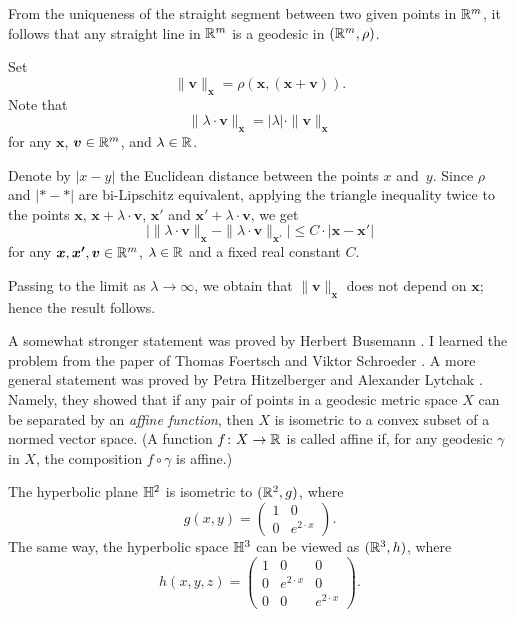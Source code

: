 From the uniqueness of the straight segment between two given points in $\mathbb{R}^m$,
it follows that any straight line in $\mathbb{R}^m$ is a geodesic in $(\mathbb{R}^m,\rho)$.

Set 
\[\|\bm{v}\|_{\bm{x}}=\rho(\bm{x},(\bm{x}+\bm{v})).\]
Note that 
\[ \|\lambda\cdot\bm{v}\|_{\bm{x}}
=
|\lambda|\cdot\|\bm{v}\|_{\bm{x}}\]
for any $\bm{x}$, $\bm{v}\in\mathbb{R}^m$, and $\lambda\in\mathbb{R}$.

Denote by $|x-y|$ the Euclidean distance between the points $x$ and~$y$.
Since $\rho$ and $|{*}-{*}|$ are bi-Lipschitz equivalent,
applying the triangle inequality twice to the points $\bm{x}$, $\bm{x}+\lambda\cdot\bm{v}$, $\bm{x}'$ and $\bm{x}'+\lambda\cdot\bm{v}$, we get
\[
\bigl|\|\lambda\cdot\bm{v}\|_{\bm{x}}
-
\|\lambda\cdot\bm{v}\|_{\bm{x}'}\bigr|
\le 
C\cdot |\bm{x}-\bm{x'}|\]
for any $\bm{x},\bm{x'},\bm{v}\in\mathbb{R}^m$, 
$\lambda\in\mathbb{R}$
and a fixed real constant $C$.

Passing to the limit as $\lambda\to\infty$, 
we obtain that
$\|\bm{v}\|_{\bm{x}}$ does not depend on $\bm{x}$;
hence the result follows.\qeds

A somewhat stronger statement was proved by Herbert Busemann \cite[§ 17]{busemann1955}.
I learned the problem from the paper of Thomas Foertsch
and Viktor Schroeder \cite{foertsch-schroeder}.
A more general statement was proved by Petra Hitzelberger and Alexander Lytchak \cite{hitzelberger-lytchak}.
Namely, they showed that 
if any pair of points in a geodesic metric space $X$ can be separated by an \emph{affine function},
then $X$ is isometric to a convex subset of a normed vector space.
(A function $f\colon X\to\mathbb{R}$ is called affine if, for any geodesic $\gamma$ in $X$, the composition $f\circ\gamma$ is affine.)

The hyperbolic plane $\mathbb{H}^2$ is isometric to $(\mathbb{R}^2,g)$, where 
\[g(x,y)=\left(\begin{matrix}
 1&0
 \\
 0&e^{2\cdot x}
 \end{matrix}\right).\]
The same way, the hyperbolic space $\mathbb{H}^3$
can be viewed as $(\mathbb{R}^3,h)$, where 
\[h(x,y,z)=\left(\begin{matrix}
 1&0&0
 \\
 0&e^{2\cdot x}&0
 \\
 0&0&e^{2\cdot x}
\end{matrix}\right).\]

